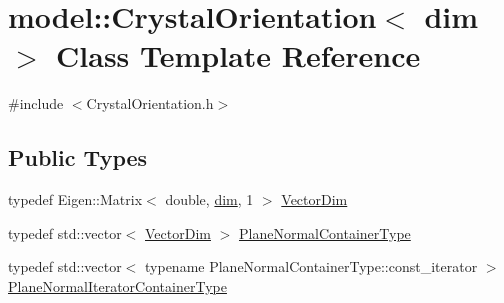 \hypertarget{classmodel_1_1_crystal_orientation}{}\section{model\+:\+:Crystal\+Orientation$<$ dim $>$ Class Template Reference}
\label{classmodel_1_1_crystal_orientation}


{\ttfamily \#include $<$Crystal\+Orientation.\+h$>$}

\subsection*{Public Types}
\begin{DoxyCompactItemize}
\item 
typedef Eigen\+::\+Matrix$<$ double, \hyperlink{plot_nd_a_8m_a382f3ca768b275b8d563604f7fc7df73}{dim}, 1 $>$ \hyperlink{classmodel_1_1_crystal_orientation_a32108cd454d481e0e57a0d2801d2adaa}{Vector\+Dim}
\item 
typedef std\+::vector$<$ \hyperlink{classmodel_1_1_crystal_orientation_a32108cd454d481e0e57a0d2801d2adaa}{Vector\+Dim} $>$ \hyperlink{classmodel_1_1_crystal_orientation_a55ae599a60a13e109c1445889b42f87b}{Plane\+Normal\+Container\+Type}
\item 
typedef std\+::vector$<$ typename Plane\+Normal\+Container\+Type\+::const\+\_\+iterator $>$ \hyperlink{classmodel_1_1_crystal_orientation_a48e93a01771bebe12e6f6be1f728cd39}{Plane\+Normal\+Iterator\+Container\+Type}
\end{DoxyCompactItemize}
